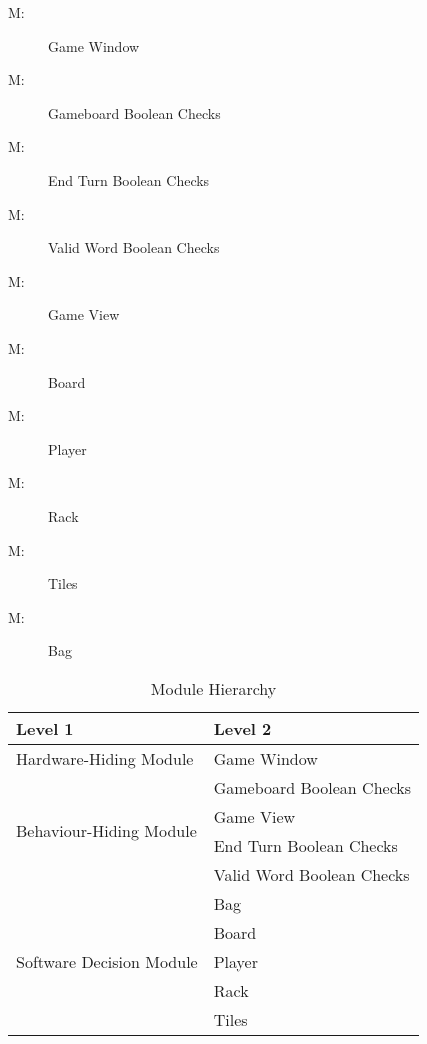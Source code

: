 \documentclass[12pt, titlepage]{article}
\newcounter{mnum}
\newcommand{\mthemnum}{M\themnum}
\begin{document}
\begin{description}
\item [ \mthemnum \label{mHHGW}:] Game Window %
\item [ \mthemnum \label{mBHGB}:] Gameboard Boolean Checks %
\item [ \mthemnum \label{mBHET}:] End Turn Boolean Checks %
\item [ \mthemnum \label{mBHVW}:] Valid Word Boolean Checks %
\item [ \mthemnum \label{mBHGV}:] Game View %
\item [ \mthemnum \label{mSDBO}:] Board %
\item [ \mthemnum \label{mSDP}:] Player %
\item [ \mthemnum \label{mSDR}:] Rack %
\item [ \mthemnum \label{mSDT}:] Tiles %
\item [ \mthemnum \label{mSDB}:] Bag %
\end{description}


\begin{table}[h!]
\centering
\begin{tabular}{p{} p{}}
\toprule
\textbf{Level 1} & \textbf{Level 2}\\
\midrule

{Hardware-Hiding Module} & Game Window \\
\midrule

\multirow{4}{0.3\textwidth}{Behaviour-Hiding Module} & Gameboard Boolean Checks\\
& Game View\\
& End Turn Boolean Checks\\
& Valid Word Boolean Checks\\
\midrule

\multirow{5}{0.3\textwidth}{Software Decision Module} & Bag\\
& Board\\
& Player\\
& Rack\\
& Tiles\\
\bottomrule

\end{tabular}
\caption{Module Hierarchy}
\label{TblMH}
\end{table}
\end{document}
